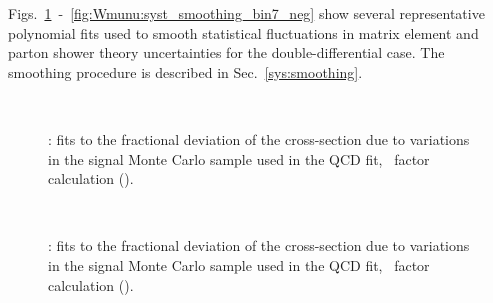 Figs.~\ref{fig:Wmunu:syst_smoothing_bin1_pos}~-~\ref{fig:Wmunu:syst_smoothing_bin7_neg} show several representative polynomial fits used to smooth statistical fluctuations in matrix element and parton shower theory uncertainties for the double-differential case. The smoothing procedure is described in Sec.~\ref{sys:smoothing}.

\begin{figure}[phtb]
  \begin{center}
         \\
 \caption{\Wmunup: fits to the fractional deviation of the cross-section due to variations in the signal Monte Carlo sample used in the QCD fit, \C\ factor calculation (\ptZero).}
 \label{fig:Wmunu:syst_smoothing_bin1_pos}
 \end{center}
\end{figure}

\begin{figure}[phtb]
  \begin{center}
         \\
 \caption{\Wmunum: fits to the fractional deviation of the cross-section due to variations in the signal Monte Carlo sample used in the QCD fit, \C\ factor calculation (\ptZero).}
 \label{fig:Wmunu:syst_smoothing_bin1_neg}
 \end{center}
\end{figure}

